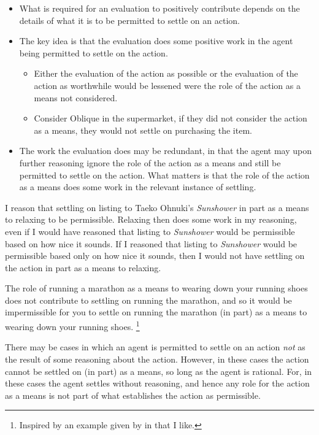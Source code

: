\documentclass[10pt]{article}
\begin{document}
\begin{itemize}[noitemsep]
\item What is required for an evaluation to positively contribute depends on the details of what it is to be permitted to settle on an action.
\item The key idea is that the evaluation does some positive work in the agent being permitted to settle on the action.
  \begin{itemize}
  \item Either the evaluation of the action as possible or the evaluation of the action as worthwhile would be lessened were the role of the action as a means not considered.
  \item Consider Oblique in the supermarket, if they did not consider the action as a means, they would not settle on purchasing the item.
  \end{itemize}
\item The work the evaluation does may be redundant, in that the agent may upon further reasoning ignore the role of the action as a means and still be permitted to settle on the action.
  What matters is that the role of the action as a means does some work in the relevant instance of settling.
\end{itemize}


\begin{example}
  I reason that settling on listing to Taeko Ohnuki's \emph{Sunshower} in part as a means to relaxing to be permissible.
  Relaxing then does some work in my reasoning, even if I would have reasoned that listing to \emph{Sunshower} would be permissible based on how nice it sounds.
  If I reasoned that listing to \emph{Sunshower} would be permissible based only on how nice it sounds, then I would not have settling on the action in part as a means to relaxing.
\end{example}

\begin{example}
  The role of running a marathon as a means to wearing down your running shoes does not contribute to settling on running the marathon, and so it would be impermissible for you to settle on running the marathon (in part) as a means to wearing down your running shoes.\nolinebreak
  \footnote{Inspired by an example given by \citeauthor{Bratman:1987aa} in  that I like. }
\end{example}

There may be cases in which an agent is permitted to settle on an action \emph{not} as the result of some reasoning about the action.
However, in these cases the action cannot be settled on (in part) as a means, so long as the agent is rational.
For, in these cases the agent settles without reasoning, and hence any role for the action as a means is not part of what establishes the action as permissible.
\end{document}
